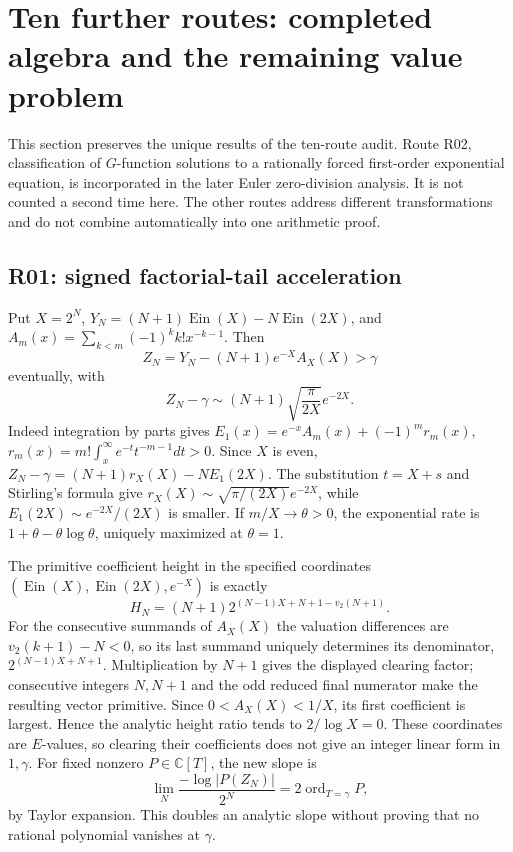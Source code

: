 \documentclass[11pt,a4paper]{article}
\newcommand{\C}{\mathbb C}
\newcommand{\Ein}{\operatorname{Ein}}
\theoremstyle{definition}
\theoremstyle{remark}
\numberwithin{equation}{section}
\begin{document}
\section{Ten further routes: completed algebra and the remaining value problem}
\label{ar:tenroutes}
This section preserves the unique results of the ten-route audit.  Route
R02, classification of $G$-function solutions to a rationally forced
first-order exponential equation, is incorporated in the later Euler
zero-division analysis.  It is not counted a second time here.  The other
routes address different transformations and do not combine automatically
into one arithmetic proof.

\subsection{R01: signed factorial-tail acceleration}
Put $X=2^N$, $Y_N=(N+1)\Ein(X)-N\Ein(2X)$, and
$A_m(x)=\sum_{k<m}(-1)^kk!x^{-k-1}$.  Then
\[
 Z_N=Y_N-(N+1)e^{-X}A_X(X)>\gamma
\]
eventually, with
\begin{equation}\label{ar:accelerated}
 Z_N-\gamma\sim(N+1)\sqrt{\frac\pi{2X}}e^{-2X}.
\end{equation}
Indeed integration by parts gives
$E_1(x)=e^{-x}A_m(x)+(-1)^mr_m(x)$,
$r_m(x)=m!\int_x^\infty e^{-t}t^{-m-1}dt>0$.
Since $X$ is even,
$Z_N-\gamma=(N+1)r_X(X)-NE_1(2X)$.
The substitution $t=X+s$ and Stirling's formula give
$r_X(X)\sim\sqrt{\pi/(2X)}e^{-2X}$, while
$E_1(2X)\sim e^{-2X}/(2X)$ is smaller.  If $m/X\to\theta>0$, the
exponential rate is $1+\theta-\theta\log\theta$, uniquely maximized at
$\theta=1$.

The primitive coefficient height in the specified coordinates
$(\Ein(X),\Ein(2X),e^{-X})$ is exactly
\begin{equation}\label{ar:accelheight}
 H_N=(N+1)2^{(N-1)X+N+1-v_2(N+1)}.
\end{equation}
For the consecutive summands of $A_X(X)$ the valuation differences are
$v_2(k+1)-N<0$, so its last summand uniquely determines its denominator,
$2^{(N-1)X+N+1}$.  Multiplication by $N+1$ gives the displayed clearing
factor; consecutive integers $N,N+1$ and the odd reduced final numerator
make the resulting vector primitive.  Since $0<A_X(X)<1/X$, its first
coefficient is largest.  Hence the analytic height ratio tends to
$2/\log X=0$.  These coordinates are $E$-values, so clearing their
coefficients does not give an integer linear form in $1,\gamma$.
For fixed nonzero $P\in\C[T]$, the new slope is
\[
 \lim_N\frac{-\log|P(Z_N)|}{2^N}
 =2\operatorname{ord}_{T=\gamma}P,
\]
by Taylor expansion.  This doubles an analytic slope without proving that
no rational polynomial vanishes at $\gamma$.
\end{document}
